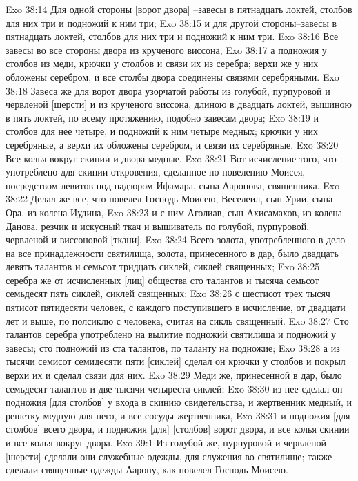 Exo 38:14  Для одной стороны [ворот двора] --завесы в пятнадцать локтей, столбов для них три и подножий к ним три;
Exo 38:15  и для другой стороны--завесы в пятнадцать локтей, столбов для них три и подножий к ним три.
Exo 38:16  Все завесы во все стороны двора из крученого виссона,
Exo 38:17  а подножия у столбов из меди, крючки у столбов и связи их из серебра; верхи же у них обложены серебром, и все столбы двора соединены связями серебряными.
Exo 38:18  Завеса же для ворот двора узорчатой работы из голубой, пурпуровой и червленой [шерсти] и из крученого виссона, длиною в двадцать локтей, вышиною в пять локтей, по всему протяжению, подобно завесам двора;
Exo 38:19  и столбов для нее четыре, и подножий к ним четыре медных; крючки у них серебряные, а верхи их обложены серебром, и связи их серебряные.
Exo 38:20  Все колья вокруг скинии и двора медные.
Exo 38:21  Вот исчисление того, что употреблено для скинии откровения, сделанное по повелению Моисея, посредством левитов под надзором Ифамара, сына Ааронова, священника.
Exo 38:22  Делал же все, что повелел Господь Моисею, Веселеил, сын Урии, сына Ора, из колена Иудина,
Exo 38:23  и с ним Аголиав, сын Ахисамахов, из колена Данова, резчик и искусный ткач и вышиватель по голубой, пурпуровой, червленой и виссоновой [ткани].
Exo 38:24  Всего золота, употребленного в дело на все принадлежности святилища, золота, принесенного в дар, было двадцать девять талантов и семьсот тридцать сиклей, сиклей священных;
Exo 38:25  серебра же от исчисленных [лиц] общества сто талантов и тысяча семьсот семьдесят пять сиклей, сиклей священных;
Exo 38:26  с шестисот трех тысяч пятисот пятидесяти человек, с каждого поступившего в исчисление, от двадцати лет и выше, по полсиклю с человека, считая на сикль священный.
Exo 38:27  Сто талантов серебра употреблено на вылитие подножий святилища и подножий у завесы; сто подножий из ста талантов, по таланту на подножие;
Exo 38:28  а из тысячи семисот семидесяти пяти [сиклей] сделал он крючки у столбов и покрыл верхи их и сделал связи для них.
Exo 38:29  Меди же, принесенной в дар, было семьдесят талантов и две тысячи четыреста сиклей;
Exo 38:30  из нее сделал он подножия [для столбов] у входа в скинию свидетельства, и жертвенник медный, и решетку медную для него, и все сосуды жертвенника,
Exo 38:31  и подножия [для столбов] всего двора, и подножия [для] [столбов] ворот двора, и все колья скинии и все колья вокруг двора.
Exo 39:1  Из голубой же, пурпуровой и червленой [шерсти] сделали они служебные одежды, для служения во святилище; также сделали священные одежды Аарону, как повелел Господь Моисею.
